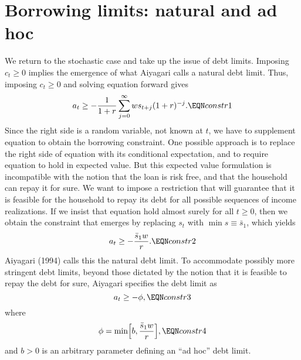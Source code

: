 \section{Borrowing limits: natural and ad hoc}
  We return to the stochastic case and take up the issue
of debt limits.
  Imposing $c_t \geq 0$ implies the emergence of
what Aiyagari calls a natural debt  limit.  Thus,
imposing $c_t \geq 0$  and solving equation  forward gives
$$ a_t \geq -{1 \over 1+r} \sum_{j=0}^\infty
 w s_{t+j} (1+r)^{-j}.\EQN constr1$$
Since the right side is a random variable, not known
at $t$, we have to supplement equation  to obtain
the borrowing constraint.  One possible approach is to
replace the right side of equation  with its conditional
expectation, and to require equation 
to hold in expected value. But this expected value formulation
is incompatible with the notion that the
loan is risk free, and
that the household can repay it for sure. We want to impose a restriction
that will guarantee that it is feasible for the household to repay its debt for all
possible sequences of income realizations.
      If we insist that equation  hold almost surely
for all $t\geq 0$,
then  we obtain the constraint that emerges by replacing  $s_t$
with ${\min s} \equiv \bar s_1$, which yields
$$ a _t \geq - {\bar s_1 w \over r}.  \EQN constr2 $$
Aiyagari (1994) calls this the natural debt limit.  To accommodate
possibly more stringent debt limits, beyond those dictated by
the notion that it is feasible to repay the debt for sure,
Aiyagari specifies the debt limit as
$$ a_t \geq -\phi, \EQN constr3$$
where
 $$ \phi =  \min \Bigl[b, {\bar s_1 w\over r}\Bigr] , \EQN constr4 $$
and $b>0$ is an arbitrary parameter defining an
``ad hoc'' debt limit.

